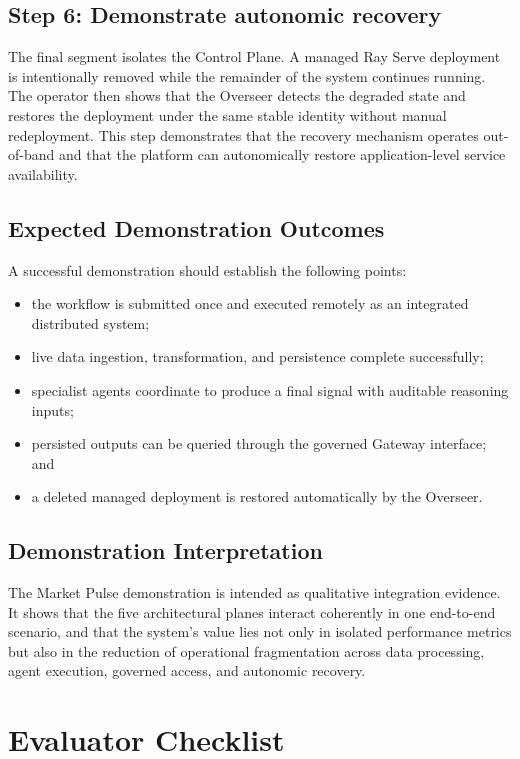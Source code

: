 \documentclass[12pt, a4paper]{report}
\begin{document}
\subsection*{Step 6: Demonstrate autonomic recovery}
The final segment isolates the Control Plane. A managed Ray Serve deployment is
intentionally removed while the remainder of the system continues running. The
operator then shows that the Overseer detects the degraded state and restores the
deployment under the same stable identity without manual redeployment. This step
demonstrates that the recovery mechanism operates out-of-band and that the platform
can autonomically restore application-level service availability.

\subsection*{Expected Demonstration Outcomes}
A successful demonstration should establish the following points:

\begin{itemize}
  \item the workflow is submitted once and executed remotely as an integrated distributed system;
  \item live data ingestion, transformation, and persistence complete successfully;
  \item specialist agents coordinate to produce a final signal with auditable reasoning inputs;
  \item persisted outputs can be queried through the governed Gateway interface; and
  \item a deleted managed deployment is restored automatically by the Overseer.
\end{itemize}

\subsection*{Demonstration Interpretation}
The Market Pulse demonstration is intended as qualitative integration evidence. It
shows that the five architectural planes interact coherently in one end-to-end
scenario, and that the system's value lies not only in isolated performance metrics
but also in the reduction of operational fragmentation across data processing, agent
execution, governed access, and autonomic recovery.

\section{Evaluator Checklist}
\label{app:demo_checklist}
\end{document}
